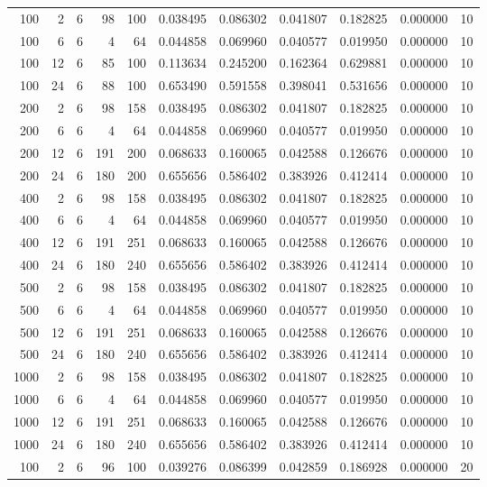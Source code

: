 \begin{table}
\begin{tabular}{rrrrrrrrrrr}
100 & 2 & 6 & 98 & 100 & 0.038495 & 0.086302 & 0.041807 & 0.182825 & 0.000000 & 10 \\
100 & 6 & 6 & 4 & 64 & 0.044858 & 0.069960 & 0.040577 & 0.019950 & 0.000000 & 10 \\
100 & 12 & 6 & 85 & 100 & 0.113634 & 0.245200 & 0.162364 & 0.629881 & 0.000000 & 10 \\
100 & 24 & 6 & 88 & 100 & 0.653490 & 0.591558 & 0.398041 & 0.531656 & 0.000000 & 10 \\
200 & 2 & 6 & 98 & 158 & 0.038495 & 0.086302 & 0.041807 & 0.182825 & 0.000000 & 10 \\
200 & 6 & 6 & 4 & 64 & 0.044858 & 0.069960 & 0.040577 & 0.019950 & 0.000000 & 10 \\
200 & 12 & 6 & 191 & 200 & 0.068633 & 0.160065 & 0.042588 & 0.126676 & 0.000000 & 10 \\
200 & 24 & 6 & 180 & 200 & 0.655656 & 0.586402 & 0.383926 & 0.412414 & 0.000000 & 10 \\
400 & 2 & 6 & 98 & 158 & 0.038495 & 0.086302 & 0.041807 & 0.182825 & 0.000000 & 10 \\
400 & 6 & 6 & 4 & 64 & 0.044858 & 0.069960 & 0.040577 & 0.019950 & 0.000000 & 10 \\
400 & 12 & 6 & 191 & 251 & 0.068633 & 0.160065 & 0.042588 & 0.126676 & 0.000000 & 10 \\
400 & 24 & 6 & 180 & 240 & 0.655656 & 0.586402 & 0.383926 & 0.412414 & 0.000000 & 10 \\
500 & 2 & 6 & 98 & 158 & 0.038495 & 0.086302 & 0.041807 & 0.182825 & 0.000000 & 10 \\
500 & 6 & 6 & 4 & 64 & 0.044858 & 0.069960 & 0.040577 & 0.019950 & 0.000000 & 10 \\
500 & 12 & 6 & 191 & 251 & 0.068633 & 0.160065 & 0.042588 & 0.126676 & 0.000000 & 10 \\
500 & 24 & 6 & 180 & 240 & 0.655656 & 0.586402 & 0.383926 & 0.412414 & 0.000000 & 10 \\
1000 & 2 & 6 & 98 & 158 & 0.038495 & 0.086302 & 0.041807 & 0.182825 & 0.000000 & 10 \\
1000 & 6 & 6 & 4 & 64 & 0.044858 & 0.069960 & 0.040577 & 0.019950 & 0.000000 & 10 \\
1000 & 12 & 6 & 191 & 251 & 0.068633 & 0.160065 & 0.042588 & 0.126676 & 0.000000 & 10 \\
1000 & 24 & 6 & 180 & 240 & 0.655656 & 0.586402 & 0.383926 & 0.412414 & 0.000000 & 10 \\
100 & 2 & 6 & 96 & 100 & 0.039276 & 0.086399 & 0.042859 & 0.186928 & 0.000000 & 20 \\

\end{tabular}
\end{table}
